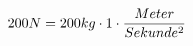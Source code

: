 \documentclass[preview]{standalone}
\begin{document}
\begin{align*}
\special{dvisvgm:raw <g id='unique000'>}200N = 200kg \cdot 1 \cdot \frac{Meter}{Sekunde^{2}}\special{dvisvgm:raw </g>}
\end{align*}
\end{document}
